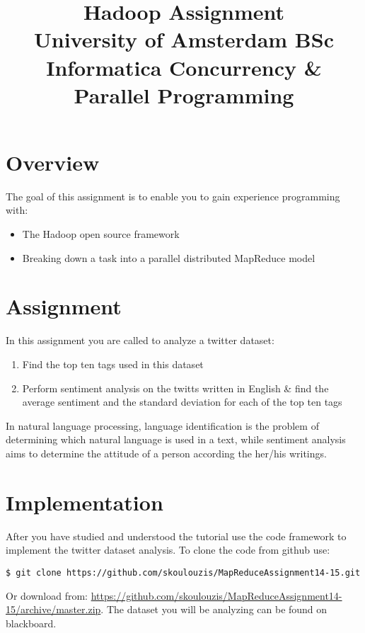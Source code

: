 \documentclass[a4paper,10pt]{article}
\date{}
\title{Hadoop Assignment\\
University of Amsterdam BSc Informatica
Concurrency \& Parallel Programming
}
\begin{document}
\maketitle

\tableofcontents

\section{Overview}
The goal of this assignment is to enable you to gain experience programming with:
\begin{itemize}
 \item The Hadoop open source framework
 \item Breaking down a task into a parallel distributed MapReduce model
\end{itemize}


\section{Assignment}

In this assignment you are called to analyze a twitter dataset: 
\begin{enumerate}
 \item Find the top ten tags used in this dataset 
 \item Perform sentiment analysis on the twitts written in English \& find the average sentiment and the standard deviation for each of the top ten tags
\end{enumerate}

In natural language processing, language identification is the problem of determining which natural language is used in a text, while sentiment analysis aims to determine the attitude of a person according the her/his writings.   

\section{Implementation}
After you have studied and understood the tutorial use the code framework to implement the twitter dataset analysis. To clone the code from github use:
\lstset{language=} 
\begin{lstlisting}
$ git clone https://github.com/skoulouzis/MapReduceAssignment14-15.git
\end{lstlisting}
Or download from: \url{https://github.com/skoulouzis/MapReduceAssignment14-15/archive/master.zip}. 
The dataset you will be analyzing can be found on blackboard.
\end{document}
